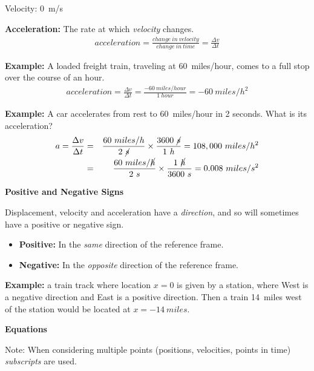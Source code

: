 \documentclass[12pt]{article}
\begin{document}
Velocity: 0~m/s

\noindent \textbf{Acceleration:} The rate at which \textit{velocity} changes.
\begin{eqnarray}
acceleration = \frac{change~in~velocity}{change~in~time} = \frac{\Delta v}{\Delta t}
\end{eqnarray}

\noindent\textbf{Example:} A loaded freight train, traveling at 60~miles/hour, comes to a full stop over the course of an hour. 
\begin{eqnarray}
acceleration = \frac{\Delta v}{\Delta t} = \frac{-60~miles/hour}{1~hour} = -60~miles/h^2
\end{eqnarray}

\noindent \textbf{Example:} A car accelerates from rest to 60~miles/hour in 2 seconds. What is its acceleration?
\begin{eqnarray}
a = \frac{\Delta v}{\Delta t} &=& \frac{60~miles/h}{2~\cancel{s}}\times\frac{3600~\cancel{s}}{1~h} = 108,000~miles/h^2 \\
&=& \frac{60~miles/\cancel{h}}{2~s} \times \frac{1~\cancel{h}}{3600~s} = 0.008 ~miles/s^2
\end{eqnarray}

\noindent \textbf{\large Positive and Negative Signs}

Displacement, velocity and acceleration have a \textit{direction}, and so will sometimes have a positive or negative sign.

\begin{itemize}
	\item \textbf{Positive:} In the \textit{same} direction of the reference frame.
	\item \textbf{Negative:} In the \textit{opposite} direction of the reference frame.
\end{itemize}

\noindent \textbf{Example:} a train track where location $x=0$ is given by a station, where West is a negative direction and East is a positive direction. Then a train 14~miles west of the station would be located at $x = -14~miles$.

\begin{center}\end{center}

\noindent \textbf{\large Equations}

Note: When considering multiple points (positions, velocities, points in time) \textit{subscripts} are used.
\end{document}

